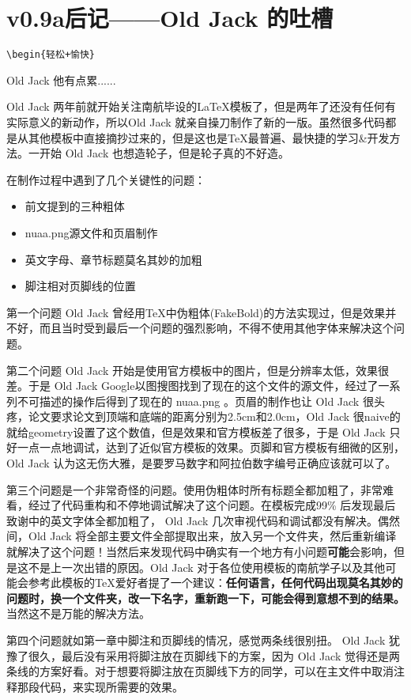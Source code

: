 \chapter{v0.9a后记——Old Jack 的吐槽}

\verb!\begin{轻松+愉快}!

Old Jack 他有点累......

Old Jack 两年前就开始关注南航毕设的\LaTeX 模板了，但是两年了还没有任何有实际意义的新动作，所以Old Jack 就亲自操刀制作了新的一版。虽然很多代码都是从其他模板中直接摘抄过来的，但是这也是\TeX 最普遍、最快捷的学习\&开发方法。一开始 Old Jack 也想造轮子，但是轮子真的不好造。

在制作过程中遇到了几个关键性的问题：
\begin{itemize}
  \item 前文提到的三种粗体
  \item nuaa.png源文件和页眉制作
  \item 英文字母、章节标题莫名其妙的加粗
  \item 脚注相对页脚线的位置
\end{itemize}

第一个问题 Old Jack 曾经用\TeX 中伪粗体(FakeBold)的方法实现过，但是效果并不好，而且当时受到最后一个问题的强烈影响，不得不使用其他字体来解决这个问题。

第二个问题 Old Jack 开始是使用官方模板中的图片，但是分辨率太低，效果很差。于是 Old Jack Google以图搜图找到了现在的这个文件的源文件，经过了一系列不可描述的操作后得到了现在的 nuaa.png 。页眉的制作也让 Old Jack 很头疼，论文要求论文到顶端和底端的距离分别为2.5cm和2.0cm，Old Jack 很naive的就给geometry设置了这个数值，但是效果和官方模板差了很多，于是 Old Jack 只好一点一点地调试，达到了近似官方模板的效果。页脚和官方模板有细微的区别，Old Jack 认为这无伤大雅，是要罗马数字和阿拉伯数字编号正确应该就可以了。

第三个问题是一个非常奇怪的问题。使用伪粗体时所有标题全都加粗了，非常难看，经过了代码重构和不停地调试解决了这个问题。在模板完成99\% 后发现最后致谢中的英文字体全都加粗了， Old Jack 几次审视代码和调试都没有解决。偶然间，Old Jack 将全部主要文件全部提取出来，放入另一个文件夹，然后重新编译就解决了这个问题！当然后来发现代码中确实有一个地方有小问题\textbf{可能}会影响，但是这不是上一次出错的原因。Old Jack 对于各位使用模板的南航学子以及其他可能会参考此模板的\TeX 爱好者提了一个建议：\textbf{任何语言，任何代码出现莫名其妙的问题时，换一个文件夹，改一下名字，重新跑一下，可能会得到意想不到的结果。}当然这不是万能的解决方法。

第四个问题就如第一章中脚注和页脚线的情况，感觉两条线很别扭。 Old Jack 犹豫了很久，最后没有采用将脚注放在页脚线下的方案，因为 Old Jack 觉得还是两条线的方案好看。对于想要将脚注放在页脚线下方的同学，可以在主文件中取消注释那段代码，来实现所需要的效果。

